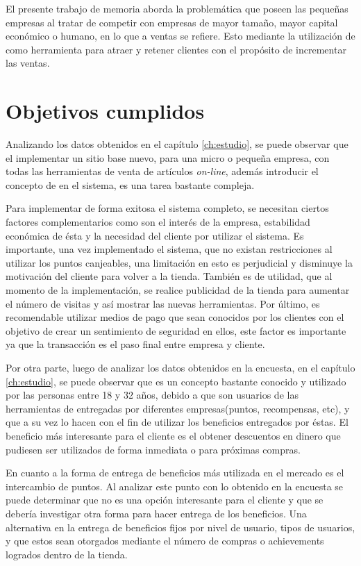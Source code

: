 El presente trabajo de memoria aborda la problemática que poseen las pequeñas
empresas al tratar de competir con empresas de mayor tamaño, mayor capital
económico o humano, en lo que a ventas se refiere. Esto mediante la utilización de {\gam} 
como herramienta para atraer y retener clientes con el propósito de incrementar las ventas.

\section{Objetivos cumplidos}

Analizando los datos obtenidos en el capítulo \ref{ch:estudio}, se puede observar que el
implementar un sitio base nuevo, para una micro o pequeña empresa, con todas las
herramientas de venta de artículos \emph{on-line}, además introducir el concepto de {\gam} en el sistema,
 es una tarea bastante compleja.

Para implementar de forma exitosa el sistema completo, se necesitan ciertos factores
complementarios como son el interés de la empresa, estabilidad económica de ésta y la necesidad del cliente 
por utilizar el sistema. Es importante, una vez implementado el sistema, que no existan restricciones 
al utilizar los puntos canjeables, una limitación en esto es perjudicial y disminuye la motivación del 
cliente para volver a la tienda.
También es de utilidad, que al momento de la implementación, se realice publicidad
de la tienda para aumentar el número de visitas y así mostrar las nuevas herramientas. 
Por último, es recomendable utilizar medios de pago que sean conocidos
por los clientes con el objetivo de crear un sentimiento de seguridad en ellos, este factor es importante
ya que la transacción es el paso final entre empresa y cliente.

Por otra parte, luego de analizar los datos obtenidos en la encuesta, en el capítulo \ref{ch:estudio},
 se puede observar que {\gam} es un concepto bastante conocido y utilizado por las personas
entre 18 y 32 años, debido a que son usuarios de las herramientas de {\gam} entregadas por
diferentes empresas(puntos, recompensas, etc), y que a su vez lo hacen con el fin de utilizar los beneficios entregados
por éstas. El beneficio más interesante para el cliente es el obtener descuentos en dinero
que pudiesen ser utilizados de forma inmediata o para próximas compras.

En cuanto a la forma de entrega de beneficios más utilizada en el mercado es el intercambio de puntos.
Al analizar este punto con lo obtenido en la encuesta se puede determinar que no es
una opción interesante para el cliente y que se debería investigar otra forma para
hacer entrega de los beneficios. Una alternativa en la entrega de beneficios fijos por nivel
de usuario, tipos de usuarios,  y que estos sean otorgados mediante el número de compras o achievements logrados
dentro de la tienda.

